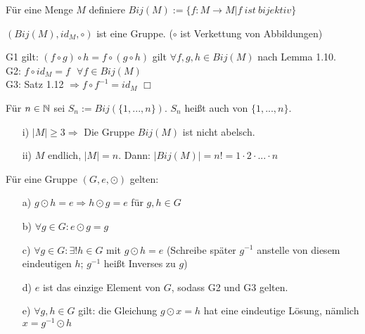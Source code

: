 \begin{defi}
	Für eine Menge $M$ definiere $Bij(M):=\{f:M\rightarrow M|f\:ist\:bijektiv\}$
\end{defi}

\begin{prop}
	$(Bij(M),id_{M},\circ)$ ist eine Gruppe. ($\circ$ ist Verkettung von Abbildungen)
\end{prop}

\begin{bew}
	G1 gilt: $(f\circ g)\circ h=f\circ(g\circ h)$ gilt $\forall f,g,h\in Bij(M)$ nach Lemma 1.10.\\
	G2: $f\circ id_{M}=f\:\:\:\forall f\in Bij(M)$\\
	G3: Satz 1.12 $\Rightarrow f\circ f^{-1}=id_{M}$ \hfill $\Box$
\end{bew}

\begin{defi}
	Für $n\in\mathbb{N}$ sei $S_{n}:=Bij(\{1,...,n\})$. $S_{n}$ heißt auch  von $\{1,...,n\}$.
\end{defi}

\begin{ub}
	\begin{itemize}
		\item[]
		\item[i)] $|M|\geq 3 \Rightarrow$ Die Gruppe $Bij(M)$ ist nicht abelsch.
		\item[ii)] $M$ endlich, $|M|=n$. Dann: $|Bij(M)|=n!=1\cdot 2\cdot ... \cdot n$
	\end{itemize}
\end{ub}

\begin{prop}
	Für eine Gruppe $(G,e,\odot)$ gelten:
	\begin{itemize}
		\item[a)] $g\odot h=e\Rightarrow h\odot g=e$ für $g,h\in G$
		\item[b)] $\forall g\in G:e\odot g=g$
		\item[c)] $\forall g\in G:\exists !h\in G$ mit $g\odot h=e$ (Schreibe später $g^{-1}$ anstelle von diesem eindeutigen $h$; $g^{-1}$ heißt Inverses zu $g$)
		\item[d)] $e$ ist das einzige Element von $G$, sodass G2 und G3 gelten.
		\item[e)] $\forall g,h\in G$ gilt: die Gleichung $g\odot x=h$ hat eine eindeutige Lösung, nämlich $x=g^{-1}\odot h$
	\end{itemize}
\end{prop}

